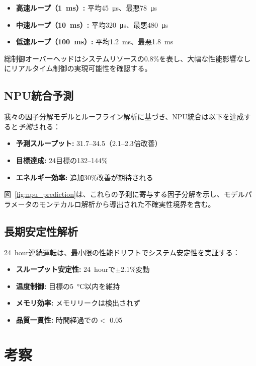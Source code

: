 \documentclass[10pt,twocolumn,a4paper]{jarticle}
\newcommand{\tps}{\text{tok/s}}
\newcommand{\ppl}{\mathrm{PPL}}
\begin{document}
\begin{itemize}
\item \textbf{高速ループ（\SI{1}{ms}）:} 平均\SI{45}{\micro s}、最悪\SI{78}{\micro s}
\item \textbf{中速ループ（\SI{10}{ms}）:} 平均\SI{320}{\micro s}、最悪\SI{480}{\micro s}  
\item \textbf{低速ループ（\SI{100}{ms}）:} 平均\SI{1.2}{ms}、最悪\SI{1.8}{ms}
\end{itemize}

総制御オーバーヘッドはシステムリソースの0.8\%を表し、大幅な性能影響なしにリアルタイム制御の実現可能性を確認する。

\subsection{NPU統合予測}

我々の因子分解モデルとルーフライン解析に基づき、NPU統合は以下を達成すると\emph{予測}される：

\begin{itemize}
\item \textbf{予測スループット:} 31.7--\SI{34.5}{\tps}（2.1--2.3倍改善）
\item \textbf{目標達成:} \SI{24}{\tps}目標の132--144\%
\item \textbf{エネルギー効率:} 追加30\%改善が期待される
\end{itemize}

図~\ref{fig:npu_prediction}は、これらの予測に寄与する因子分解を示し、モデルパラメータのモンテカルロ解析から導出された不確実性境界を含む。

\subsection{長期安定性解析}

\SI{24}{hour}連続運転は、最小限の性能ドリフトでシステム安定性を実証する：

\begin{itemize}
\item \textbf{スループット安定性:} \SI{24}{hour}で$\pm$2.1\%変動
\item \textbf{温度制御:} 目標の\SI{5}{\celsius}以内を維持
\item \textbf{メモリ効率:} メモリリークは検出されず
\item \textbf{品質一貫性:} 時間経過での$<$ 0.05
\end{itemize}

\section{考察}
\end{document}
